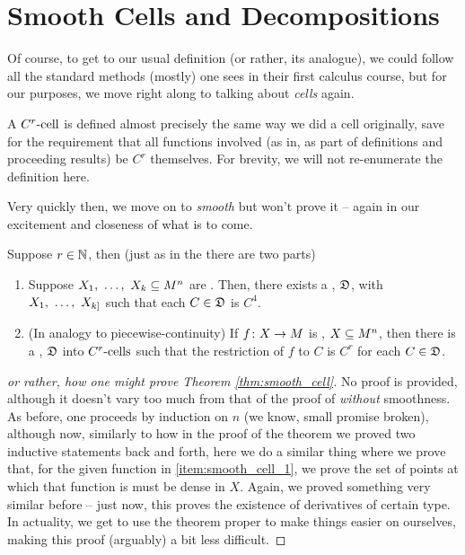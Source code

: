 
\section{Smooth Cells and Decompositions}

Of course, to get to our usual definition (or rather, its analogue), we could follow all the standard methods (mostly) one sees in their first calculus course, but for our purposes, we move right along to talking about \emph{cells} again.

\begin{definition}[$C^r$-cells]
A $\Crcell[r]$ is defined almost precisely the same way we did a cell originally, save for the requirement that all functions involved (as in, as part of definitions and proceeding results) be $C^r$ themselves. For brevity, we will not re-enumerate the definition here.
\end{definition}

Very quickly then, we move on to \emph{smooth} \cd but won't prove it -- again in our excitement and closeness of what is to come.

\begin{theorem}
  Suppose $r \in \N$, then (just as in the \CDt there are two parts)
    \begin{enumerate}
      \item \label{item:smooth_cell_1} Suppose $\vonevm{X}{k} \subseteq M^n$ are . Then, there exists a \cd, $\fancyD$, \cmptble with $\vonevm{X}{k]}$ such that each $C \in \fancyD$ is $C^4$.

      \item \label{item:smooth_cell_2} (In analogy to piecewise-continuity) If $\funcdom{f}{X}{M}$ is , $\XMn[X]{n}$, then there is a \cd, $\fancyD$ into $\Crcells$ such that the restriction of $f$ to $C$ is $C^r$ for each $C \in \fancyD$.
    \end{enumerate}

  \label{thm:smooth_cell}
\end{theorem}

\begin{proof}[or rather, how one might prove Theorem \ref{thm:smooth_cell}]
  No proof is provided, although it doesn't vary too much from that of the proof of \CD \emph{without} smoothness. As before, one proceeds by induction on $n$ (we know, small promise broken), although now, similarly to how in the proof of the \CD theorem we proved two inductive statements back and forth, here we do a similar thing where we prove that, for the given function in \ref {item:smooth_cell_1}, we prove the set of points at which that function is \cont must be dense in $X$. Again, we proved something very similar before -- just now, this proves the existence of derivatives of certain type. In actuality, we get to use the \CD theorem proper to make things easier on ourselves, making this proof (arguably) a bit less difficult.
\end{proof}

